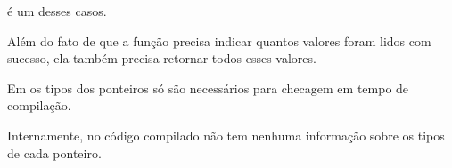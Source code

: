  é um desses casos.

Além do fato de que a função precisa indicar quantos valores foram lidos com sucesso, ela também precisa retornar todos esses valores.

Em \CCpp os tipos dos ponteiros só são necessários para checagem em tempo de compilação.

Internamente, no código compilado não tem nenhuma informação sobre os tipos de cada ponteiro.





